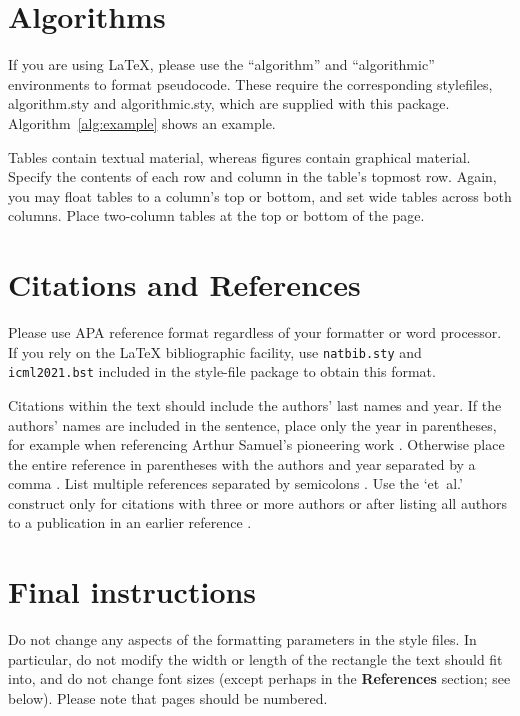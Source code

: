 \documentclass{article}
\begin{document}
\section{Algorithms}

If you are using \LaTeX, please use the ``algorithm'' and ``algorithmic''
environments to format pseudocode. These require
the corresponding stylefiles, algorithm.sty and
algorithmic.sty, which are supplied with this package.
Algorithm~\ref{alg:example} shows an example.





Tables contain textual material, whereas figures contain graphical material.
Specify the contents of each row and column in the table's topmost
row. Again, you may float tables to a column's top or bottom, and set
wide tables across both columns. Place two-column tables at the
top or bottom of the page.

\section{Citations and References}

Please use APA reference format regardless of your formatter
or word processor. If you rely on the \LaTeX\/ bibliographic
facility, use \texttt{natbib.sty} and \texttt{icml2021.bst}
included in the style-file package to obtain this format.

Citations within the text should include the authors' last names and
year. If the authors' names are included in the sentence, place only
the year in parentheses, for example when referencing Arthur Samuel's
pioneering work . Otherwise place the entire
reference in parentheses with the authors and year separated by a
comma \cite{Samuel59}. List multiple references separated by
semicolons \cite{kearns89,Samuel59,mitchell80}. Use the `et~al.'
construct only for citations with three or more authors or after
listing all authors to a publication in an earlier reference \cite{MachineLearningI}.


\section{Final instructions}

Do not change any aspects of the formatting parameters in the style files.  In
particular, do not modify the width or length of the rectangle the text should
fit into, and do not change font sizes (except perhaps in the
\textbf{References} section; see below). Please note that pages should be
numbered.
\end{document}
